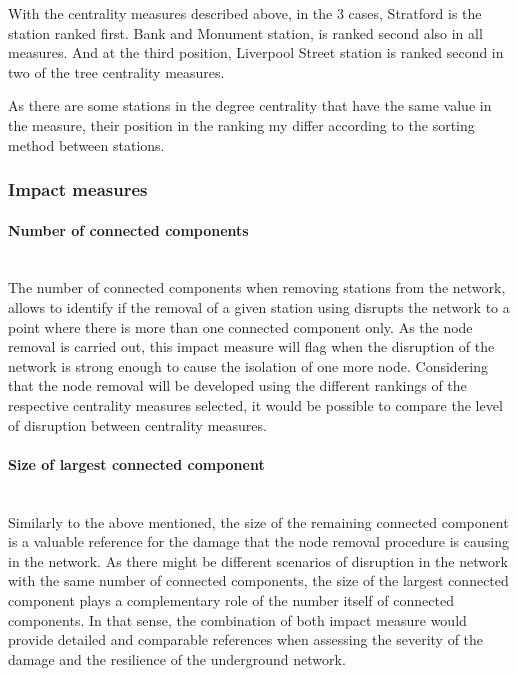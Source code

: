 \documentclass{article}
\begin{document}
With the centrality measures described above, in the 3 cases, Stratford is the station ranked first. Bank and Monument station, is ranked second also in all measures. And at the third position, Liverpool Street station is ranked second in two of the tree centrality measures.

As there are some stations in the degree centrality that have the same value in the measure, their position in the ranking my differ according to the sorting method between stations.

\subsubsection{Impact measures}

\paragraph{Number of connected components}\mbox{}\\

The number of connected components when removing stations from the network, allows to identify if the removal of a given station using disrupts the network to a point where there is more than one connected component only. As the node removal is carried out, this impact measure will flag when the disruption of the network is strong enough to cause the isolation of one more node. Considering that the node removal will be developed using the different rankings of the respective centrality measures selected, it would be possible to compare the level of disruption between centrality measures.

\paragraph{Size of largest connected component}\mbox{}\\

Similarly to the above mentioned, the size of the remaining connected component is a valuable reference for the damage that the node removal procedure is causing in the network. As there might be different scenarios of disruption in the network with the same number of connected components, the size of the largest connected component plays a complementary role of the number itself of connected components. In that sense, the combination of both impact measure would provide detailed and comparable references when assessing the severity of the damage and the resilience of the underground network.
\end{document}
